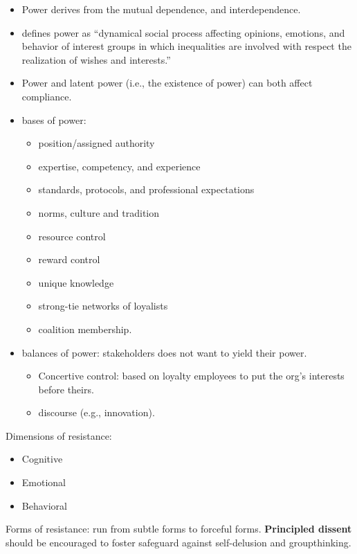 \documentclass[
]{book}
\begin{document}
\begin{itemize}
\item
  Power derives from the mutual dependence, and interdependence.
\item
  \citep[pp.~99]{j.boonstra1998} defines power as ``dynamical social process affecting opinions, emotions, and behavior of
  interest groups in which inequalities are involved with respect the realization of wishes and interests.''
\item
  Power and latent power (i.e., the existence of power) can both affect compliance.
\item
  bases of power:

  \begin{itemize}
  \item
    position/assigned authority
  \item
    expertise, competency, and experience
  \item
    standards, protocols, and professional expectations
  \item
    norms, culture and tradition
  \item
    resource control
  \item
    reward control
  \item
    unique knowledge
  \item
    strong-tie networks of loyalists
  \item
    coalition membership.
  \end{itemize}
\item
  balances of power: stakeholders does not want to yield their power.

  \begin{itemize}
  \item
    Concertive control: based on loyalty employees to put the org's interests before theirs.
  \item
    discourse (e.g., innovation).
  \end{itemize}
\end{itemize}

Dimensions of resistance:

\begin{itemize}
\item
  Cognitive
\item
  Emotional
\item
  Behavioral
\end{itemize}

Forms of resistance: run from subtle forms to forceful forms. \textbf{Principled dissent} should be encouraged to foster
safeguard against self-delusion and groupthinking.
\end{document}
